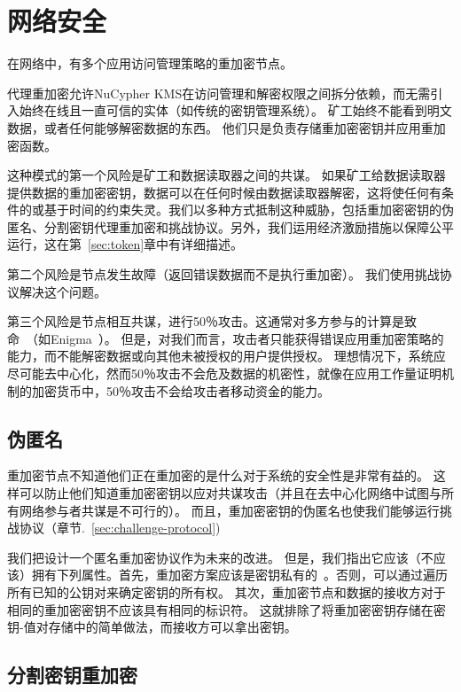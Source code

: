\documentclass[longbibliography,nofootinbib]{revtex4-1}
\begin{document}
\section{网络安全}

在网络中，有多个应用访问管理策略的重加密节点。

    代理重加密允许NuCypher KMS在访问管理和解密权限之间拆分依赖，而无需引入始终在线且一直可信的实体（如传统的密钥管理系统）。 矿工始终不能看到明文数据，或者任何能够解密数据的东西。 他们只是负责存储重加密密钥并应用重加密函数。
    
    这种模式的第一个风险是矿工和数据读取器之间的共谋。 如果矿工给数据读取器提供数据的重加密密钥，数据可以在任何时候由数据读取器解密，这将使任何有条件的或基于时间的约束失灵。我们以多种方式抵制这种威胁，包括重加密密钥的伪匿名、分割密钥代理重加密和挑战协议。另外，我们运用经济激励措施以保障公平运行，这在第~\ref{sec:token}章中有详细描述。

第二个风险是节点发生故障（返回错误数据而不是执行重加密）。 我们使用挑战协议解决这个问题。

第三个风险是节点相互共谋，进行50％攻击。这通常对多方参与的计算是致命~\cite{vitalik-secret-dao}（如Enigma~\cite{enigma}）。 但是，对我们而言，攻击者只能获得错误应用重加密策略的能力，而不能解密数据或向其他未被授权的用户提供授权。 理想情况下，系统应尽可能去中心化，然而50％攻击不会危及数据的机密性，就像在应用工作量证明机制的加密货币中，50％攻击不会给攻击者移动资金的能力。

\subsection{伪匿名}
\label{sec:anonymity}

重加密节点不知道他们正在重加密的是什么对于系统的安全性是非常有益的。 这样可以防止他们知道重加密密钥以应对共谋攻击（并且在去中心化网络中试图与所有网络参与者共谋是不可行的）。 而且，重加密密钥的伪匿名也使我们能够运行挑战协议（章节.~\ref{sec:challenge-protocol})

我们把设计一个匿名重加密协议作为未来的改进。 但是，我们指出它应该（不应该）拥有下列属性。首先，重加密方案应该是密钥私有的~\cite{Ateniese-key-private,lwe-reencryption}。否则，可以通过遍历所有已知的公钥对来确定密钥的所有权。 其次，重加密节点和数据的接收方对于相同的重加密密钥不应该具有相同的标识符。 这就排除了将重加密密钥存储在密钥-值对存储中的简单做法，而接收方可以拿出密钥。

\subsection{分割密钥重加密}
\label{sec:split-key}
\end{document}

